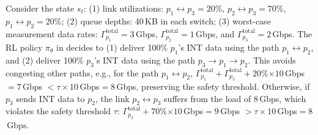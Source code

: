Consider the state $s_t$: (1) link utilizations: $p_1\leftrightarrow p_3=20$\%, $p_2\leftrightarrow p_3=70$\%, $p_1\leftrightarrow p_2=20$\%; (2) queue depths: 40\,KB in each switch; (3) worst-case measurement data rates: $\Gamma_{p_1}^{\text{total}}=3$\,Gbps, $\Gamma_{p_2}^{\text{total}}=1$\,Gbps, and $\Gamma_{p_3}^{\text{total}}=2$\,Gbps. The RL policy $\pi_{\theta}$ in \sysname decides to (1) deliver 100\% $p_1$'s INT data using the path $p_1\leftrightarrow p_2$, and (2) deliver 100\% $p_3$'s INT data using the path $p_3\rightarrow p_1\rightarrow p_2$. This avoids congesting other paths, e.g., for the path $p_1 \leftrightarrow p_2$, $\Gamma_{p_1}^{\text{total}}+\Gamma_{p_3}^{\text{total}}+20$\%$\times 10$\,Gbps$=7$\,Gbps $< \tau\times 10$\,Gbps$=8$\,Gbps, preserving the safety threshold. Otherwise, if $p_3$ sends INT data to $p_2$, the link $p_2\leftrightarrow p_3$ suffers from the load of 8\,Gbps, which violates the safety threshold $\tau$: $\Gamma_{p_3}^{\text{total}}+70$\%$\times 10$\,Gbps$=9$\,Gbps $> \tau\times 10$\,Gbps$=8$\,Gbps. 












